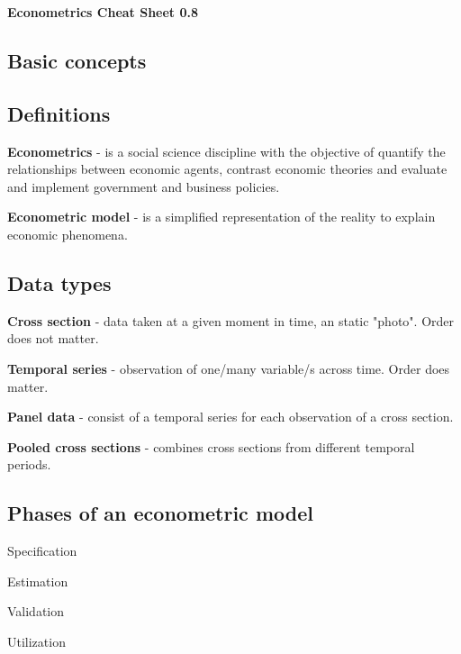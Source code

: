 \documentclass[10pt,landscape]{article}
\begin{document}
\begin{center}
\textbf{\Large Econometrics Cheat Sheet 0.8}
\end{center}

\begin{multicols}{3} %

\section*{Basic concepts}
\subsection*{Definitions}

\textbf{Econometrics} - is a social science discipline with the objective of quantify the relationships between economic agents, contrast economic theories and evaluate and implement government and business policies.

\textbf{Econometric model} - is a simplified representation of the reality to explain economic phenomena.

\subsection*{Data types}

\textbf{Cross section} - data taken at a given moment in time, an static "photo". Order does not matter.

\textbf{Temporal series} - observation of one/many variable/s across time. Order does matter.

\textbf{Panel data} - consist of a temporal series for each observation of a cross section.

\textbf{Pooled cross sections} - combines cross sections from different temporal periods.

\subsection*{Phases of an econometric model}

\begin{enumerate}[leftmargin=*]
\setlength{\multicolsep}{0pt}
\begin{multicols}{2}
\item Specification
\item Estimation
\columnbreak
\item Validation
\item Utilization
\end{multicols}
\end{enumerate}


\end{multicols}
\end{document}
